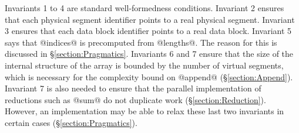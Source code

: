 Invariants 1 to 4 are standard well-formedness conditions. Invariant 2 ensures that each physical segment identifier points to a real physical segment. Invariant 3 ensures that each data block identifier points to a real data block. Invariant 5 says that @indices@ is precomputed from @lengths@. The reason for this is discussed in \S\ref{section:Pragmatics}. Invariants 6 and 7 ensure that the size of the internal structure of the array is bounded by the number of virtual segments, which is necessary for the complexity bound on @append@ (\S\ref{section:Append}). Invariant 7 is also needed to ensure that the parallel implementation of reductions such as @sum@ do not duplicate work (\S\ref{section:Reduction}). However, an implementation may be able to relax these last two invariants in certain cases (\S\ref{section:Pragmatics}).


